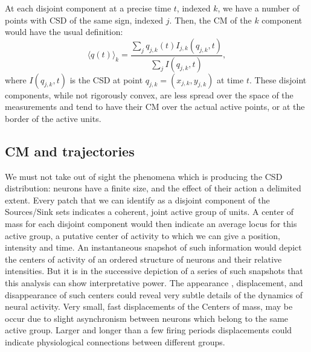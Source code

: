 \documentclass{article}
\begin{document}
At each disjoint component at a precise time $t$, indexed $k$, we have a number of points with CSD of the same sign, indexed $j$. Then, the CM of the $k$ component would have the usual definition:
\begin{equation}\label{cmparadisj}
   \langle q(t) \rangle_k =\frac{\sum_j q_{j,k} (t) I_{j,k} (q_{j,k},t)}
           {\sum_j I(q_{j,k},t)},
\end{equation}
where $I(q_{j,k},t)$ is the CSD at point $q_{j,k}=(x_{j,k}, y_{j,k})$ at time $t$. These disjoint components, while not rigorously convex, are less spread over the space of the measurements and tend to have their CM over the actual active points, or at the border of the active units.

\subsection{CM and trajectories}

We must not take out of sight the phenomena which is producing the CSD distribution: neurons have a finite size, and the effect of their action a delimited extent. Every patch that we can identify as a disjoint component of the Sources/Sink sets indicates a coherent, joint active group of units. A center of mass for each disjoint component would then indicate an average locus for this active group, a putative center of activity to which we can give a position, intensity and time. An instantaneous snapshot of such information would depict the centers of activity of an ordered structure of neurons and their relative intensities. But it is in the successive depiction of a series of such snapshots that this analysis can show interpretative power. The appearance , displacement, and disappearance of such centers could reveal very subtle details of the dynamics of neural activity. Very small, fast displacements of the Centers of mass, may be occur due to slight asynchronism between neurons which belong to the same active group. Larger and  longer than a few firing periods displacements could indicate physiological connections between different groups.
\end{document}
